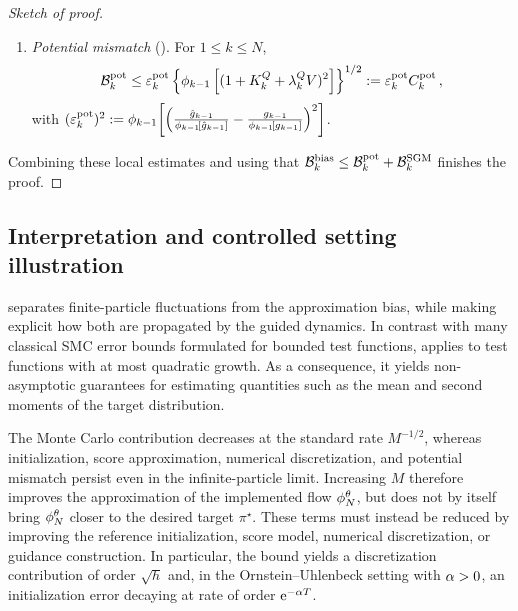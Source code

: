 \documentclass[11pt]{article}
\theoremstyle{plain}
\theoremstyle{definition}
\theoremstyle{remark}
\begin{document}
\begin{proof}[Sketch of proof]
\begin{enumerate}[leftmargin=*,label=(\roman*),itemsep=1pt]
\item \emph{Potential mismatch} (). For $1\le k\le N$,
\begin{equation} \label{eq:def_e_pot}
    \mathcal B_k^{\rm pot} \le \varepsilon_k^{\rm pot} \left\{
    \filter{k-1}
    \left[
    (1+K_k^Q+\lambda_k^Q V)^2
    \right]
    \right\}^{1/2}
    \eqdef \varepsilon_k^{\rm pot} C_k^{\rm pot} \eqsp,
\end{equation}
with $(\varepsilon_k^{\rm pot})^2 \eqdef \filter{k-1}\!\left[
\left( \frac{\approxpot{k-1}}{\filter{k-1}[\approxpot{k-1}]} - \frac{\pot{k-1}} {\filter{k-1}[\pot{k-1}]} \right)^2\right]$.
\end{enumerate}
Combining these local estimates and using that $\mathcal B_k^{\rm bias} \le \mathcal B_k^{\rm pot} + \mathcal B_k^{\rm SGM}$ finishes the proof.
\end{proof}


\subsection{Interpretation and controlled setting illustration}

 separates finite-particle fluctuations from the approximation bias, while making explicit how both are propagated by the guided dynamics. In contrast with many classical SMC error bounds formulated for bounded test functions,  applies to test functions with at most quadratic growth. As a consequence, it yields non-asymptotic guarantees for estimating quantities such as the mean and second moments of the target distribution.

The Monte Carlo contribution decreases at the standard rate $M^{-1/2}$, whereas initialization, score approximation, numerical discretization, and potential mismatch persist even in the infinite-particle limit. Increasing $M$ therefore improves the approximation of the implemented flow $\approxfilter{N}$, but does not by itself bring $\approxfilter{N}$ closer to the desired target $\pi^\star$. These terms must instead be reduced by improving the reference initialization, score model, numerical discretization, or guidance construction. In particular, the bound yields a discretization contribution of order $\sqrt h$ and, in the Ornstein--Uhlenbeck setting with $\alpha>0$, an initialization error decaying at rate of order $\mathrm{e}^{- \alpha T}$.
\end{document}
